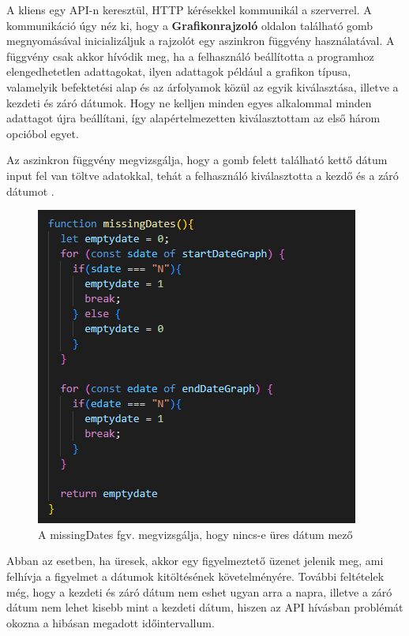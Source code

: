 \pagebreak

A kliens egy API-n keresztül, HTTP kérésekkel kommunikál a szerverrel. A kommunikáció úgy néz ki, hogy a \textbf{Grafikonrajzoló} oldalon található gomb megnyomásával inicializáljuk a rajzolót egy aszinkron függvény használatával. A függvény csak akkor hívódik meg, ha a felhasználó beállította a programhoz elengedhetetlen adattagokat, ilyen adattagok például a grafikon típusa, valamelyik befektetési alap és az árfolyamok közül az egyik kiválasztása, illetve a kezdeti és záró dátumok. Hogy ne kelljen minden egyes alkalommal minden adattagot újra beállítani, így alapértelmezetten kiválasztottam az első három opcióbol egyet.
	
	Az aszinkron függvény megvizsgálja, hogy a gomb felett található kettő dátum input fel van töltve adatokkal, tehát a felhasználó kiválasztotta a kezdő és a záró dátumot . 

\begin{figure}[h]
\centering
\includegraphics[scale=0.8]{images/dateValidation.png}
\caption{A missingDates fgv. megvizsgálja, hogy nincs-e üres dátum mező}
\label{fig:validation}
\end{figure}

Abban az esetben, ha üresek, akkor egy figyelmeztető üzenet jelenik meg, ami felhívja a figyelmet a dátumok kitöltésének követelményére. További feltételek még, hogy a kezdeti és záró dátum nem eshet ugyan arra a napra, illetve a záró dátum nem lehet kisebb mint a kezdeti dátum, hiszen az API hívásban problémát okozna a hibásan megadott időintervallum.

